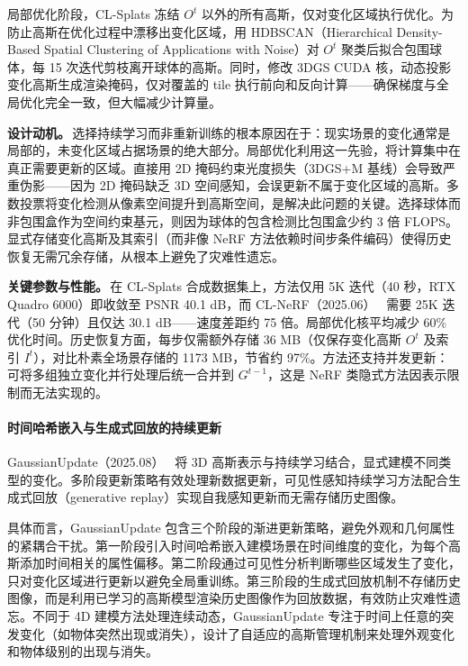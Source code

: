 局部优化阶段，CL-Splats 冻结 $O^t$ 以外的所有高斯，仅对变化区域执行优化。为防止高斯在优化过程中漂移出变化区域，用 HDBSCAN（Hierarchical Density-Based Spatial Clustering of Applications with Noise）对 $O^t$ 聚类后拟合包围球体，每 15 次迭代剪枝离开球体的高斯。同时，修改 3DGS CUDA 核，动态投影变化高斯生成渲染掩码，仅对覆盖的 tile 执行前向和反向计算——确保梯度与全局优化完全一致，但大幅减少计算量。

\textbf{设计动机。}\,选择持续学习而非重新训练的根本原因在于：现实场景的变化通常是局部的，未变化区域占据场景的绝大部分。局部优化利用这一先验，将计算集中在真正需要更新的区域。直接用 2D 掩码约束光度损失（3DGS+M 基线）会导致严重伪影——因为 2D 掩码缺乏 3D 空间感知，会误更新不属于变化区域的高斯。多数投票将变化检测从像素空间提升到高斯空间，是解决此问题的关键。选择球体而非包围盒作为空间约束基元，则因为球体的包含检测比包围盒少约 3 倍 FLOPS。显式存储变化高斯及其索引（而非像 NeRF 方法依赖时间步条件编码）使得历史恢复无需冗余存储，从根本上避免了灾难性遗忘。

\textbf{关键参数与性能。}\,在 CL-Splats 合成数据集上，方法仅用 5K 迭代（40 秒，RTX Quadro 6000）即收敛至 PSNR 40.1 dB，而 CL-NeRF（2025.06）~\cite{2506_21117} 需要 25K 迭代（50 分钟）且仅达 30.1 dB——速度差距约 75 倍。局部优化核平均减少 60\% 优化时间。历史恢复方面，每步仅需额外存储 36 MB（仅保存变化高斯 $O^t$ 及索引 $I^t$），对比朴素全场景存储的 1173 MB，节省约 97\%。方法还支持并发更新：可将多组独立变化并行处理后统一合并到 $G^{t-1}$，这是 NeRF 类隐式方法因表示限制而无法实现的。

\paragraph{时间哈希嵌入与生成式回放的持续更新}

GaussianUpdate（2025.08）~\cite{2508_08867} 将 3D 高斯表示与持续学习结合，显式建模不同类型的变化。多阶段更新策略有效处理新数据更新，可见性感知持续学习方法配合生成式回放（generative replay）实现自我感知更新而无需存储历史图像。

具体而言，GaussianUpdate 包含三个阶段的渐进更新策略，避免外观和几何属性的紧耦合干扰。第一阶段引入时间哈希嵌入建模场景在时间维度的变化，为每个高斯添加时间相关的属性偏移。第二阶段通过可见性分析判断哪些区域发生了变化，只对变化区域进行更新以避免全局重训练。第三阶段的生成式回放机制不存储历史图像，而是利用已学习的高斯模型渲染历史图像作为回放数据，有效防止灾难性遗忘。不同于 4D 建模方法处理连续动态，GaussianUpdate 专注于时间上任意的突发变化（如物体突然出现或消失），设计了自适应的高斯管理机制来处理外观变化和物体级别的出现与消失。


